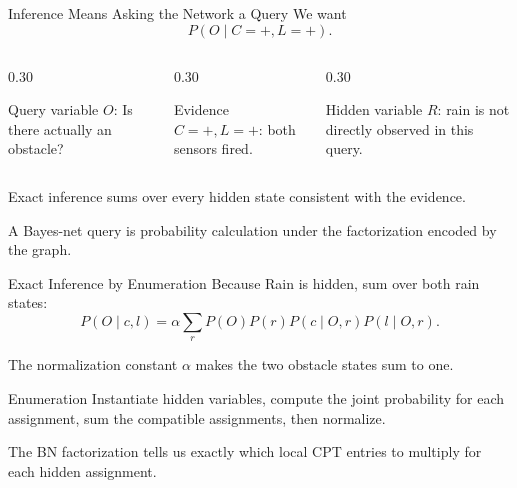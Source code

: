 \documentclass[aspectratio=169,10pt]{beamer}
\begin{document}
\begin{frame}[shrink=10]{Inference Means Asking the Network a Query}
  We want
  \[
    P(O\mid C=+,L=+).
  \]

  \begin{columns}[T,onlytextwidth]
    \begin{column}{0.30\textwidth}
      \begin{block}{Query variable}
        $O$: Is there actually an obstacle?
      \end{block}
    \end{column}
    \begin{column}{0.30\textwidth}
      \begin{block}{Evidence}
        $C=+,L=+$: both sensors fired.
      \end{block}
    \end{column}
    \begin{column}{0.30\textwidth}
      \begin{block}{Hidden variable}
        $R$: rain is not directly observed in this query.
      \end{block}
    \end{column}
  \end{columns}

  Exact inference sums over every hidden state consistent with the evidence.

  \begin{keyidea}
    A Bayes-net query is probability calculation under the factorization encoded by the graph.
  \end{keyidea}
\end{frame}

\begin{frame}[shrink=10]{Exact Inference by Enumeration}
  Because Rain is hidden, sum over both rain states:
  \[
    P(O\mid c,l)
    =
    \alpha
    \sum_r
    P(O)P(r)P(c\mid O,r)P(l\mid O,r).
  \]

  The normalization constant $\alpha$ makes the two obstacle states sum to one.

  \begin{block}{Enumeration}
    Instantiate hidden variables, compute the joint probability for each assignment, sum the compatible assignments, then normalize.
  \end{block}

  \begin{keyidea}
    The BN factorization tells us exactly which local CPT entries to multiply for each hidden assignment.
  \end{keyidea}
\end{frame}
\end{document}
